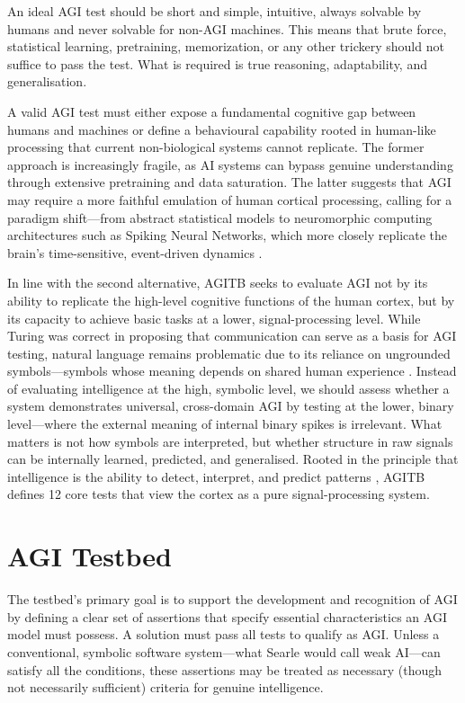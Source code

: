 \documentclass{article}
\begin{document}
	An ideal AGI test should be short and simple, intuitive, always solvable by humans and never solvable for non-AGI machines. This means that brute force, statistical learning, pretraining, memorization, or any other trickery should not suffice to pass the test. What is required is true reasoning, adaptability, and generalisation.
	
	A valid AGI test must either expose a fundamental cognitive gap between humans and machines or define a behavioural capability rooted in human-like processing that current non-biological systems cannot replicate. The former approach is increasingly fragile, as AI systems can bypass genuine understanding through extensive pretraining and data saturation. The latter suggests that AGI may require a more faithful emulation of human cortical processing, calling for a paradigm shift—from abstract statistical models to neuromorphic computing architectures such as Spiking Neural Networks, which more closely replicate the brain's time-sensitive, event-driven dynamics \cite{Maass1997}.
	
	In line with the second alternative, AGITB seeks to evaluate AGI not by its ability to replicate the high-level cognitive functions of the human cortex, but by its capacity to achieve basic tasks at a lower, signal-processing level. While Turing was correct in proposing that communication can serve as a basis for AGI testing, natural language remains problematic due to its reliance on ungrounded symbols—symbols whose meaning depends on shared human experience \cite{Harnad1990}. Instead of evaluating intelligence at the high, symbolic level, we should assess whether a system demonstrates universal, cross-domain AGI by testing at the lower, binary level—where the external meaning of internal binary spikes is irrelevant. What matters is not how symbols are interpreted, but whether structure in raw signals can be internally learned, predicted, and generalised. Rooted in the principle that intelligence is the ability to detect, interpret, and predict patterns \cite{Hawkins2004}, AGITB defines 12 core tests that view the cortex as a pure signal-processing system.
	
	
	
	\section{AGI Testbed}
	
	The testbed's primary goal is to support the development and recognition of AGI by defining a clear set of assertions that specify essential characteristics an AGI model must possess. A solution must pass all tests to qualify as AGI. Unless a conventional, symbolic software system—what Searle \cite{Searle1980} would call weak AI—can satisfy all the conditions, these assertions may be treated as necessary (though not necessarily sufficient) criteria for genuine intelligence.
	
\end{document}
